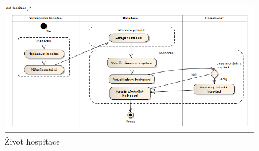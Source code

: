 \begin{figure}[h]
\begin{center}
\includegraphics[width=14cm]{figures/hospitace}
\caption{Život hospitace}
\label{fig:hospitace}
\end{center}
\end{figure}

